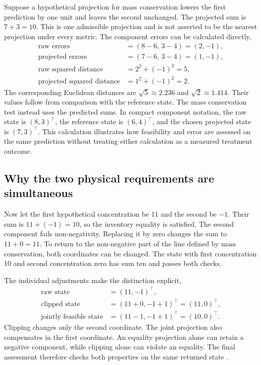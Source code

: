 Suppose a hypothetical projection for mass conservation lowers the first prediction by one unit and leaves the second unchanged. The projected sum is $7+3=10$. This is one admissible projection and is not asserted to be the nearest projection under every metric. The component errors can be calculated directly,
\[
\begin{aligned}
\text{raw errors}&=(8-6,\,3-4)=(2,-1),\\
\text{projected errors}&=(7-6,\,3-4)=(1,-1),\\
\text{raw squared distance}&=2^2+(-1)^2=5,\\
\text{projected squared distance}&=1^2+(-1)^2=2.
\end{aligned}
\]
The corresponding Euclidean distances are $\sqrt5\approx2.236$ and $\sqrt2\approx1.414$. Their values follow from comparison with the reference state. The mass conservation test instead uses the predicted sums. In compact component notation, the raw state is $(8,3)^\top$, the reference state is $(6,4)^\top$, and the chosen projected state is $(7,3)^\top$. This calculation illustrates how feasibility and error are assessed on the same prediction without treating either calculation as a measured treatment outcome.

\subsection{Why the two physical requirements are simultaneous}

Now let the first hypothetical concentration be 11 and the second be $-1$. Their sum is $11+(-1)=10$, so the inventory equality is satisfied. The second component fails non-negativity. Replacing it by zero changes the sum to $11+0=11$. To return to the non-negative part of the line defined by mass conservation, both coordinates can be changed. The state with first concentration 10 and second concentration zero has sum ten and passes both checks.

The individual adjustments make the distinction explicit,
\[
\begin{aligned}
\text{raw state}&=(11,-1)^\top,\\
\text{clipped state}&=(11+0,-1+1)^\top=(11,0)^\top,\\
\text{jointly feasible state}&=(11-1,-1+1)^\top=(10,0)^\top.
\end{aligned}
\]
Clipping changes only the second coordinate. The joint projection also compensates in the first coordinate. An equality projection alone can retain a negative component, while clipping alone can violate an equality. The final assessment therefore checks both properties on the same returned state \citep{KircherVotsmeier2025,Haddad2010}.

